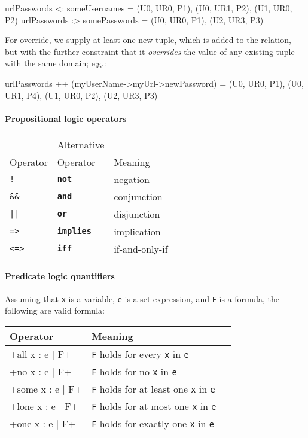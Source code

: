 \begin{alloy}
  urlPasswords <: someUsernames = {(U0, UR0, P1), (U0, UR1, P2), (U1, UR0, P2)}
  urlPasswords :> somePasswords = {(U0, UR0, P1), (U2, UR3, P3)}
\end{alloy}

For override, we supply at least one new tuple, which is added to the relation, but with the further constraint that it \emph{overrides} the value of any existing tuple with the same domain; e;g.:

\begin{alloy}
  urlPasswords ++ (myUserName->myUrl->newPassword) = 
      {(U0, UR0, P1), (U0, UR1, P4), (U1, UR0, P2), (U2, UR3, P3)}
\end{alloy}

\paragraph{Propositional logic operators}

\begin{center}
\begin{tabular}{lll}
\toprule
          & Alternative &         \\
 Operator & Operator    & Meaning \\
\midrule
 \texttt{!}  &  \texttt{\textbf{not}}  & negation\\
 \texttt{\&\&} &  \texttt{\textbf{and}}  & conjunction\\
 \texttt{||} &  \texttt{\textbf{or}}  & disjunction\\
 \texttt{=>} &  \texttt{\textbf{implies}}  & implication\\
 \texttt{<=>} &  \texttt{\textbf{iff}}  & if-and-only-if\\
\bottomrule
\end{tabular}
\end{center}

\paragraph{Predicate logic quantifiers}
Assuming that \texttt{x} is a variable, \texttt{e} is a set expression, and \texttt{F} is a formula, the following are valid formula:

\begin{center}
\begin{tabular}{lll}
\toprule
 Operator & Meaning\\
\midrule
  \A+all x : e | F+  & \texttt{F} holds for every \texttt{x} in \texttt{e}\\
  \A+no x : e | F+  & \texttt{F} holds for no \texttt{x} in \texttt{e}\\
  \A+some x : e | F+  & \texttt{F} holds for at least one \texttt{x} in \texttt{e}\\
  \A+lone x : e | F+  & \texttt{F} holds for at most one \texttt{x} in \texttt{e}\\
  \A+one x : e | F+  & \texttt{F} holds for exactly one \texttt{x} in \texttt{e}\\
\bottomrule
\end{tabular}
\end{center}

